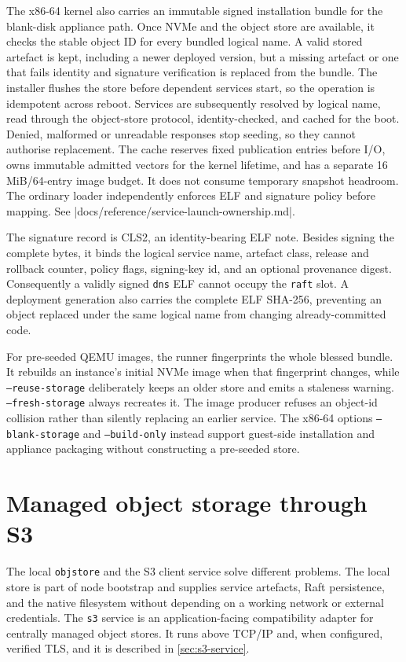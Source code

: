 The x86-64 kernel also carries an immutable signed installation bundle for the
blank-disk appliance path. Once NVMe and the object store are available, it
checks the stable object ID for every bundled logical name. A valid stored
artefact is kept, including a newer deployed version, but a missing artefact
or one that fails identity and signature verification is replaced from the
bundle. The installer flushes the store before dependent services start, so
the operation is idempotent across reboot. Services are subsequently resolved
by logical name, read through the object-store protocol, identity-checked, and
cached for the boot. Denied, malformed or unreadable responses stop seeding, so
they cannot authorise replacement. The cache reserves fixed publication entries
before I/O, owns immutable admitted vectors for the kernel lifetime, and has a
separate 16 MiB/64-entry image budget. It does not consume temporary snapshot
headroom. The ordinary loader independently enforces ELF and signature policy
before mapping. See
\repofile|docs/reference/service-launch-ownership.md|.

The signature record is CLS2, an identity-bearing ELF note. Besides signing
the complete bytes, it binds the logical service name, artefact class, release
and rollback counter, policy flags, signing-key id, and an optional provenance
digest. Consequently a validly signed \texttt{dns} ELF cannot occupy the
\texttt{raft} slot. A deployment generation also carries the complete ELF
SHA-256, preventing an object replaced under the same logical name from
changing already-committed code.

For pre-seeded QEMU images, the runner fingerprints the whole blessed bundle.
It rebuilds an instance's initial NVMe image when that fingerprint changes,
while \texttt{--reuse-storage} deliberately keeps an older store and emits a
staleness warning. \texttt{--fresh-storage} always recreates it. The image
producer refuses an object-id collision rather than silently replacing an
earlier service. The x86-64 options \texttt{--blank-storage} and
\texttt{--build-only} instead support guest-side installation and appliance
packaging without constructing a pre-seeded store.

\section{Managed object storage through S3}

The local \texttt{objstore} and the S3 client service solve different
problems. The local store is part of node bootstrap and supplies service
artefacts, Raft persistence, and the native filesystem without depending on a
working network or external credentials. The \texttt{s3} service is an
application-facing compatibility adapter for centrally managed object stores.
It runs above TCP/IP and, when configured, verified TLS, and it is described in
\autoref{sec:s3-service}.

